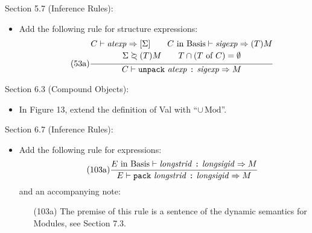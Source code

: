 \documentclass[twoside,titlepage]{article}
\begin{document}
\begin{appendix}
Section 5.7 (Inference Rules):
\begin{itemize}
\item Add the following rule for structure expressions:
  \begin{equation}
  \tag{53a}
  \frac{
  \begin{array}{@{}c@{}}
  C \vdash \mathit{atexp} \Rightarrow [\Sigma]
  \qquad
  \mbox{$C$ in Basis} \vdash \mathit{sigexp} \Rightarrow (T)M
  \\
  \Sigma\;\begin{array}{@{}c@{}}\succ\\[-8pt] \prec\end{array}\;(T)M
  \qquad
  T \cap (T~\mbox{of}~C) = \emptyset
  \end{array}
  }{
  C \vdash {\tt{unpack}}~\mathit{atexp}~\mbox{\tt:}~\mathit{sigexp} \Rightarrow M
  }
  \end{equation}
\end{itemize}

Section 6.3 (Compound Objects):
\begin{itemize}
\item In Figure 13, extend the definition of Val with ``$\cup\,\mbox{Mod}$''.
\end{itemize}

Section 6.7 (Inference Rules):
\begin{itemize}
\item Add the following rule for expressions:
  \begin{equation}
  \tag{103a}
  \frac{
  \mbox{$E$ in Basis} \vdash \mathit{longstrid}~\mbox{\tt:}~\mathit{longsigid} \Rightarrow M
  }{
  E \vdash {\tt{pack}}~\mathit{longstrid}~\mbox{\tt:}~\mathit{longsigid} \Rightarrow M
  }
  \end{equation}
  and an accompanying note:
  \begin{enumerate}
  \item[(103a)] The premise of this rule is a sentence of the dynamic semantics for Modules, see Section 7.3.
  \end{enumerate}
\end{itemize}


\end{appendix}
\end{document}
